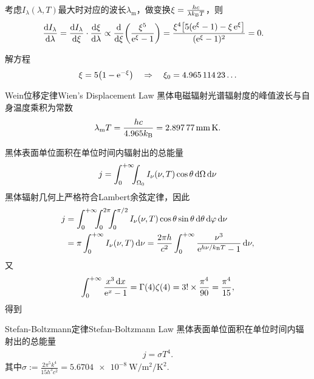 考虑$I_\lambda(\lambda,T)$最大时对应的波长$\lambda_{\mathrm m}$，做变换$\xi=\frac{hc}{\lambda\kB T}$，则
\begin{align*}
	\dv{I_\lambda}\lambda & =\dv{I_\lambda}\xi\cdot\dv\xi\lambda\propto\dd\xi\biggkh{\frac{\xi^5}{\e\xi-1}}
	=\frac{\xi^4\bigfkh{5(\e\xi-1)-\xi\e\xi}}{(\e\xi-1)^2}=0.
\end{align*}
\iffalse
	\[
		\dv{I_\lambda}\lambda=\frac c4\cdot\frac{8\pi}{3c^3}\cdot\dd\lambda\kh{\frac{h\nu}{\e{h\nu/\kB T}-1}\cdot\dd\lambda\nu^3}.
	\]
	由
	\[
		\dd\lambda=\dd\nu\cdot\dv\nu\lambda=-\frac c{\lambda^2}\dd\nu=-\frac{\nu^2}c\dd\nu.
	\]
	故
	\begin{align*}
		\dv r\lambda&=\frac{2h}{3c^2}\cdot\frac{\nu^2}{c}\cdot\dd\nu\kh{\frac{\nu}{\e{h\nu/\kB T}-1}\cdot\frac{\nu^2}c\cdot 3\nu^2}\\
		&=\frac{2h\nu^2}{c^4}\cdot\dd\nu\frac{\nu^5}{\e{h\nu/\kB T}-1},
	\end{align*}
	设$\xi:=h\nu/\kB T$，则导数等价于
	\[
		\dd\xi\frac{\xi^5}{\e\xi-1}=\frac{\xi^4}{\kh{\e\xi-1}^2}\fkh{5\kh{\e\xi-1}-\xi\e\xi}=0.
\]
\fi
解方程
\[
	\xi=5\bigkh{1-\e{-\xi}}\thus\xi_0=\num{4.96511423}\ldots
\]
\begin{theorem}{Wein位移定律}{Wien's Displacement Law}
	黑体电磁辐射光谱辐射度的峰值波长与自身温度乘积为常数
	\begin{align}
		\lambda_\mathrm m T=\frac{hc}{4.965\kB}=\SI{2.89777}{\mm\K}.
	\end{align}
\end{theorem}
\iffalse
	let $x:=\frac{\lambda kT}{hc}$, then $\d\lambda=\frac{hc}{kT}\d x,\frac{2\pi hc^2}{\lambda^5}=\frac{2\pi k^5T^5}{h^4c^3}\frac1{x^5}$
	\begin{align*}
		\frac{\d r}{\d\lambda} & =\frac{kT}{hc}\frac{2\pi k^5T^5}{h^4c^3}\frac{\d}{\d x}\frac1{x^5(e^{1/x}-1)}     \\
		                       & =\frac{2\pi k^6T^6}{h^5c^4}\frac{5x^4(e^{1/x}-1)+x^3e^{1/x}}{x^{10}(e^{1/x}-1)^2} \\
		                       & =\frac{2\pi k^6T^6}{h^5c^4}\frac{5xe^{1/x}-5x+e^{1/x}}{x^7(e^{1/x}-1)^2}
	\end{align*}
\fi
黑体表面单位面积在单位时间内辐射出的总能量
\[
	j=\int\zti\bs5\int_{\Omega_0}I_\nu(\nu,T)\cos\theta\d\Omega\d\nu
\]
黑体辐射几何上严格符合Lambert余弦定律，因此
\begin{align*}
	j & =\int\zti\bs5\int_0^{2\pi}\bs5\int_0^{\pi/2}I_\nu(\nu,T)\cos\theta\sin\theta\d\theta\d\vf\d\nu \\
	  & =\pi\int\zti I_\nu(\nu,T)\d\nu=\frac{2\pi h}{c^2}\int\zti\frac{\nu^3}{\e{h\nu/\kB T}-1}\d\nu,
\end{align*}
又
\[
	\int\zti\frac{x^3\d x}{\e x-1}=\Gamma(4)\zeta(4)=3!\times\frac{\pi^4}{90}=\frac{\pi^4}{15},
\]
得到
\begin{theorem}{Stefan-Boltzmann定律}{Stefan-Boltzmann Law}
	黑体表面单位面积在单位时间内辐射出的总能量
	\begin{align}
		j=\sigma T^4.
	\end{align}
	其中$\sigma:=\frac{2\pi^5k^4}{15h^3c^2}=\SI{5.6704e-8}{\W\per\m\squared\per\K\squared}.$
\end{theorem}
